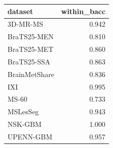 \begin{tabular}{lr}
\toprule
dataset & within\_bacc \\
\midrule
3D-MR-MS & 0.942 \\
BraTS25-MEN & 0.810 \\
BraTS25-MET & 0.860 \\
BraTS25-SSA & 0.863 \\
BrainMetShare & 0.836 \\
IXI & 0.995 \\
MS-60 & 0.733 \\
MSLesSeg & 0.943 \\
NSK-GBM & 1.000 \\
UPENN-GBM & 0.957 \\
\bottomrule
\end{tabular}
